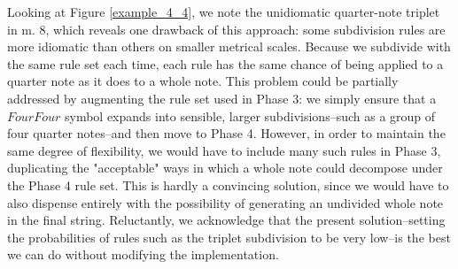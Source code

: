 \documentclass{article}
\begin{document}
Looking at Figure \ref{example_4_4}, we note the unidiomatic quarter-note triplet in m. 8, which reveals one drawback of this approach: some subdivision rules are more idiomatic than others on smaller metrical scales. Because we subdivide with the same rule set each time, each rule has the same chance of being applied to a quarter note as it does to a whole note. This problem could be partially addressed by augmenting the rule set used in Phase 3: we simply ensure that a $FourFour$ symbol expands into sensible, larger subdivisions--such as a group of four quarter notes--and then move to Phase 4. However, in order to maintain the same degree of flexibility, we would have to include many such rules in Phase 3, duplicating the "acceptable" ways in which a whole note could decompose under the Phase 4 rule set. This is hardly a convincing solution, since we would have to also dispense entirely with the possibility of generating an undivided whole note in the final string. Reluctantly, we acknowledge that the present solution--setting the probabilities of rules such as the triplet subdivision to be very low--is the best we can do without modifying the implementation.

\end{document}
